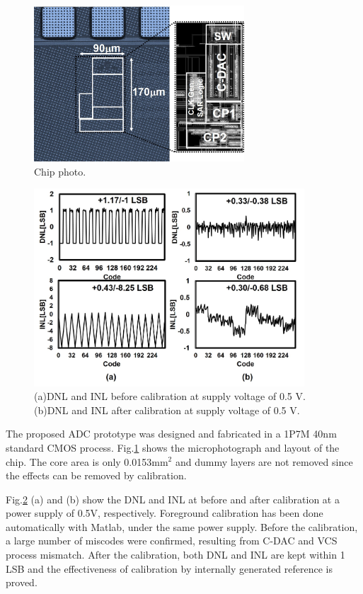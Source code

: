 \begin{figure}
\centering
  \includegraphics[width=0.7\textwidth]{figure/chap4/fig10.jpg}
  \caption{Chip photo.}
  \label{fig-4-10}
\end{figure}

\begin{figure}
\centering
  \includegraphics[width=0.9\textwidth]{figure/chap4/fig11.jpg}
  \caption{(a)DNL and INL before calibration at supply voltage of 0.5 V.
(b)DNL and INL after calibration at supply voltage of 0.5 V.}
  \label{fig-4-11}
\end{figure}

The proposed ADC prototype was designed and fabricated in a 1P7M 40nm standard CMOS process. Fig.\ref{fig-4-10} shows the microphotograph and layout of the chip. The core area is only 0.0153mm$^2$ and dummy layers are not removed since the effects can be removed by calibration.

Fig.\ref{fig-4-11} (a) and (b) show the DNL and INL at before and after calibration at a power supply of 0.5V, respectively. Foreground calibration has been done automatically with Matlab, under the same power supply. Before the calibration, a large number of miscodes were confirmed, resulting from C-DAC and VCS process mismatch. After the calibration, both DNL and INL are kept within 1 LSB and the effectiveness of calibration by internally generated reference is proved.

